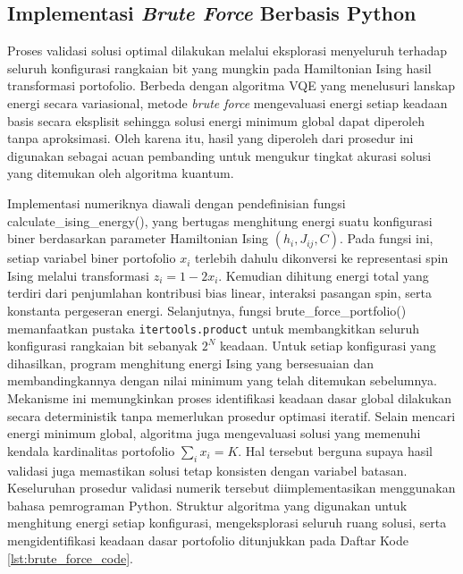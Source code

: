 \subsection{Implementasi \textit{Brute Force} Berbasis Python}
Proses validasi solusi optimal dilakukan melalui eksplorasi menyeluruh terhadap seluruh konfigurasi rangkaian bit yang mungkin pada Hamiltonian Ising hasil transformasi portofolio. Berbeda dengan algoritma VQE yang menelusuri lanskap energi secara variasional, metode \textit{brute force} mengevaluasi energi setiap keadaan basis secara eksplisit sehingga solusi energi minimum global dapat diperoleh tanpa aproksimasi. Oleh karena itu, hasil yang diperoleh dari prosedur ini digunakan sebagai acuan pembanding untuk mengukur tingkat akurasi solusi yang ditemukan oleh algoritma kuantum.

Implementasi numeriknya diawali dengan pendefinisian fungsi calculate\_ising\_energy(), yang bertugas menghitung energi suatu konfigurasi biner berdasarkan parameter Hamiltonian Ising \((h_i, J_{ij}, C)\). Pada fungsi ini, setiap variabel biner portofolio \(x_i\) terlebih dahulu dikonversi ke representasi spin Ising melalui transformasi \(z_i = 1 - 2x_i\). Kemudian dihitung energi total yang terdiri dari penjumlahan kontribusi bias linear, interaksi pasangan spin, serta konstanta pergeseran energi. Selanjutnya, fungsi brute\_force\_portfolio() memanfaatkan pustaka \texttt{itertools.product} untuk membangkitkan seluruh konfigurasi rangkaian bit sebanyak \(2^N\) keadaan. Untuk setiap konfigurasi yang dihasilkan, program menghitung energi Ising yang bersesuaian dan membandingkannya dengan nilai minimum yang telah ditemukan sebelumnya. Mekanisme ini memungkinkan proses identifikasi keadaan dasar global dilakukan secara deterministik tanpa memerlukan prosedur optimasi iteratif. Selain mencari energi minimum global, algoritma juga mengevaluasi solusi yang memenuhi kendala kardinalitas portofolio \(\sum_i x_i = K\). Hal tersebut berguna supaya hasil validasi juga memastikan solusi tetap konsisten dengan variabel batasan. Keseluruhan prosedur validasi numerik tersebut diimplementasikan menggunakan bahasa pemrograman Python. Struktur algoritma yang digunakan untuk menghitung energi setiap konfigurasi, mengeksplorasi seluruh ruang solusi, serta mengidentifikasi keadaan dasar portofolio ditunjukkan pada Daftar Kode \ref{lst:brute_force_code}.

